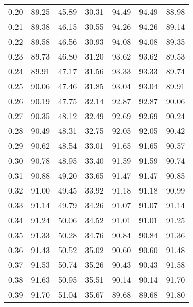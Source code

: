 \begin{tabular}{|c|c|c|c|c|c|c|}
      0.20 &     89.25 &     45.89 &      30.31 &   94.49 &      94.49 &         88.98 \\
      0.21 &     89.38 &     46.15 &      30.55 &   94.26 &      94.26 &         89.14 \\
      0.22 &     89.58 &     46.56 &      30.93 &   94.08 &      94.08 &         89.35 \\
      0.23 &     89.73 &     46.80 &      31.20 &   93.62 &      93.62 &         89.53 \\
      0.24 &     89.91 &     47.17 &      31.56 &   93.33 &      93.33 &         89.74 \\
      0.25 &     90.06 &     47.46 &      31.85 &   93.04 &      93.04 &         89.91 \\
      0.26 &     90.19 &     47.75 &      32.14 &   92.87 &      92.87 &         90.06 \\
      0.27 &     90.35 &     48.12 &      32.49 &   92.69 &      92.69 &         90.24 \\
      0.28 &     90.49 &     48.31 &      32.75 &   92.05 &      92.05 &         90.42 \\
      0.29 &     90.62 &     48.54 &      33.01 &   91.65 &      91.65 &         90.57 \\
      0.30 &     90.78 &     48.95 &      33.40 &   91.59 &      91.59 &         90.74 \\
      0.31 &     90.88 &     49.20 &      33.65 &   91.47 &      91.47 &         90.85 \\
      0.32 &     91.00 &     49.45 &      33.92 &   91.18 &      91.18 &         90.99 \\
      0.33 &     91.14 &     49.79 &      34.26 &   91.07 &      91.07 &         91.14 \\
      0.34 &     91.24 &     50.06 &      34.52 &   91.01 &      91.01 &         91.25 \\
      0.35 &     91.33 &     50.28 &      34.76 &   90.84 &      90.84 &         91.36 \\
      0.36 &     91.43 &     50.52 &      35.02 &   90.60 &      90.60 &         91.48 \\
      0.37 &     91.53 &     50.74 &      35.26 &   90.43 &      90.43 &         91.58 \\
      0.38 &     91.63 &     50.95 &      35.51 &   90.14 &      90.14 &         91.70 \\
      0.39 &     91.70 &     51.04 &      35.67 &   89.68 &      89.68 &         91.80 \\

\end{tabular}
